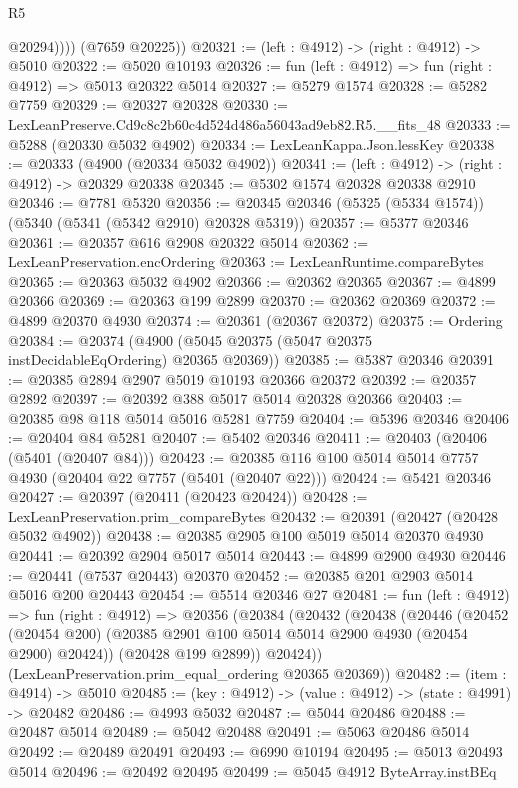 \begin{lexlean}{R5}
\begin{coremodule}
              @20294))))
      (@7659 @20225))
@20321 := (left : @4912) -> (right : @4912) -> @5010
@20322 := @5020 @10193
@20326 := fun (left : @4912) => fun (right : @4912) => @5013 @20322 @5014
@20327 := @5279 @1574
@20328 := @5282 @7759
@20329 := @20327 @20328
@20330 := LexLeanPreserve.Cd9c8c2b60c4d524d486a56043ad9eb82.R5.__fits_48
@20333 := @5288 (@20330 @5032 @4902)
@20334 := LexLeanKappa.Json.lessKey
@20338 := @20333 (@4900 (@20334 @5032 @4902))
@20341 := (left : @4912) -> (right : @4912) -> @20329 @20338
@20345 := @5302 @1574 @20328 @20338 @2910
@20346 := @7781 @5320
@20356 := @20345 @20346 (@5325 (@5334 @1574)) (@5340 (@5341 (@5342 @2910) @20328 @5319))
@20357 := @5377 @20346
@20361 := @20357 @616 @2908 @20322 @5014
@20362 := LexLeanPreservation.encOrdering
@20363 := LexLeanRuntime.compareBytes
@20365 := @20363 @5032 @4902
@20366 := @20362 @20365
@20367 := @4899 @20366
@20369 := @20363 @199 @2899
@20370 := @20362 @20369
@20372 := @4899 @20370 @4930
@20374 := @20361 (@20367 @20372)
@20375 := Ordering
@20384 := @20374 (@4900 (@5045 @20375 (@5047 @20375 instDecidableEqOrdering) @20365 @20369))
@20385 := @5387 @20346
@20391 := @20385 @2894 @2907 @5019 @10193 @20366 @20372
@20392 := @20357 @2892
@20397 := @20392 @388 @5017 @5014 @20328 @20366
@20403 := @20385 @98 @118 @5014 @5016 @5281 @7759
@20404 := @5396 @20346
@20406 := @20404 @84 @5281
@20407 := @5402 @20346
@20411 := @20403 (@20406 (@5401 (@20407 @84)))
@20423 := @20385 @116 @100 @5014 @5014 @7757 @4930 (@20404 @22 @7757 (@5401 (@20407 @22)))
@20424 := @5421 @20346
@20427 := @20397 (@20411 (@20423 @20424))
@20428 := LexLeanPreservation.prim_compareBytes
@20432 := @20391 (@20427 (@20428 @5032 @4902))
@20438 := @20385 @2905 @100 @5019 @5014 @20370 @4930
@20441 := @20392 @2904 @5017 @5014
@20443 := @4899 @2900 @4930
@20446 := @20441 (@7537 @20443) @20370
@20452 := @20385 @201 @2903 @5014 @5016 @200 @20443
@20454 := @5514 @20346 @27
@20481 := fun (left : @4912) =>
  fun (right : @4912) =>
  @20356
    (@20384
      (@20432
        (@20438
          (@20446
            (@20452 (@20454 @200) (@20385 @2901 @100 @5014 @5014 @2900 @4930 (@20454 @2900) @20424))
            (@20428 @199 @2899))
          @20424))
      (LexLeanPreservation.prim_equal_ordering @20365 @20369))
@20482 := (item : @4914) -> @5010
@20485 := (key : @4912) -> (value : @4912) -> (state : @4991) -> @20482
@20486 := @4993 @5032
@20487 := @5044 @20486
@20488 := @20487 @5014
@20489 := @5042 @20488
@20491 := @5063 @20486 @5014
@20492 := @20489 @20491
@20493 := @6990 @10194
@20495 := @5013 @20493 @5014
@20496 := @20492 @20495
@20499 := @5045 @4912 ByteArray.instBEq

\end{coremodule}
\end{lexlean}
